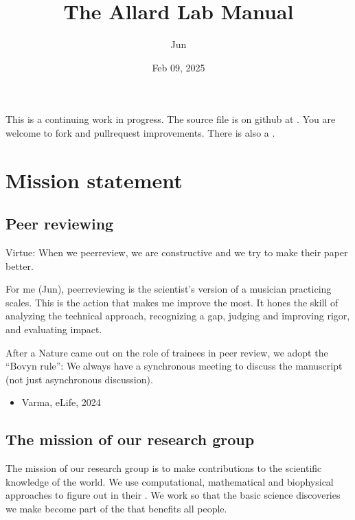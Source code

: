\documentclass[letterpaper,10pt,english]{sphinxmanual}
\title{The Allard Lab Manual}
\date{Feb 09, 2025}
\author{Jun}
\begin{document}
\pagestyle{empty}
\sphinxmaketitle
\pagestyle{plain}
\sphinxtableofcontents
\pagestyle{normal}
\label{\detokenize{index::doc}}


\sphinxAtStartPar
This is a continuing work in progress.
The source file is on github at .
You are welcome to fork and pull\sphinxhyphen{}request improvements.
There is also a .


\chapter{Mission statement}
\label{\detokenize{01OurMission:mission-statement}}\label{\detokenize{01OurMission::doc}}

\section{Peer reviewing}
\label{\detokenize{PeerReviewing:peer-reviewing}}\label{\detokenize{PeerReviewing:id1}}\label{\detokenize{PeerReviewing::doc}}
\sphinxAtStartPar
Virtue: When we peer\sphinxhyphen{}review, we are constructive and we try to make their paper better.

\sphinxAtStartPar
For me (Jun), peer\sphinxhyphen{}reviewing is the scientist’s version of a musician practicing scales. This is the action that makes me improve the most. It hones the skill of analyzing the technical approach, recognizing a gap, judging and improving rigor, and evaluating impact.

\sphinxAtStartPar
After a Nature  came out on the role of trainees in peer review, we adopt the “Bovyn rule”: We always have a synchronous meeting to discuss the manuscript (not just asynchronous discussion).
\begin{itemize}
\item {} 
\sphinxAtStartPar
Varma,  eLife, 2024

\end{itemize}


\section{The mission of our research group}
\label{\detokenize{01OurMission:the-mission-of-our-research-group}}
\sphinxAtStartPar
The mission of our research group is to make  contributions to the scientific knowledge of the world.
We use computational, mathematical and biophysical approaches to figure out  in their .
We work so that the basic science discoveries we make become part of the  that benefits all people.
\end{document}
